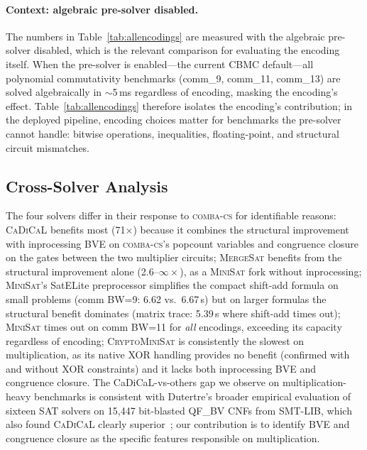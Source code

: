\documentclass[a4paper]{ceurart}
\newcommand{\combacs}{\textsc{comba-cs}\xspace}
\newcommand{\cadical}{\textsc{CaDiCaL}\xspace}
\newcommand{\minisat}{\textsc{MiniSat}\xspace}
\newcommand{\mergesat}{\textsc{MergeSat}\xspace}
\newcommand{\cryptominisat}{\textsc{CryptoMiniSat}\xspace}
\newcommand{\cbmc}{\textsc{CBMC}\xspace}
\begin{document}
\paragraph{Context: algebraic pre-solver disabled.}
The numbers in Table~\ref{tab:allencodings} are measured with the
algebraic pre-solver disabled, which is the
relevant comparison for evaluating the encoding itself. When the
pre-solver is enabled---the current \cbmc default---all polynomial
commutativity benchmarks (comm\_9, comm\_11, comm\_13) are solved
algebraically in ${\sim}$5\,ms regardless of encoding, masking
the encoding's effect. Table~\ref{tab:allencodings} therefore
isolates the encoding's contribution; in the deployed pipeline,
encoding choices matter for benchmarks the pre-solver cannot
handle: bitwise operations, inequalities, floating-point, and
structural circuit mismatches.

\subsection{Cross-Solver Analysis}

The four solvers differ in their response to \combacs for
identifiable reasons: \cadical benefits most (71$\times$) because
it combines the structural improvement with inprocessing BVE on
\combacs's popcount variables and congruence closure on the gates
between the two multiplier circuits; \mergesat benefits from the
structural improvement alone (2.6--$\infty\times$), as a \minisat
fork without inprocessing; \minisat's SatELite preprocessor
simplifies the compact shift-add formula on small problems (comm
BW=9: 6.62 vs.\ 6.67\,s) but on larger formulas the structural
benefit dominates (matrix trace: 5.39\,s where shift-add times
out); \minisat times out on comm BW=11 for \emph{all} encodings,
exceeding its capacity regardless of encoding; \cryptominisat is
consistently the slowest on multiplication, as its native XOR
handling provides no benefit (confirmed with and without XOR
constraints) and it lacks both inprocessing BVE and congruence
closure.
The CaDiCaL-vs-others gap we observe on multiplication-heavy
benchmarks is consistent with Dutertre's broader empirical
evaluation of sixteen SAT solvers on 15{,}447 bit-blasted QF\_BV
CNFs from SMT-LIB, which also found \cadical clearly
superior~\cite{dutertre2020empirical}; our contribution is to
identify BVE and congruence closure as the specific features
responsible on multiplication.
\end{document}

